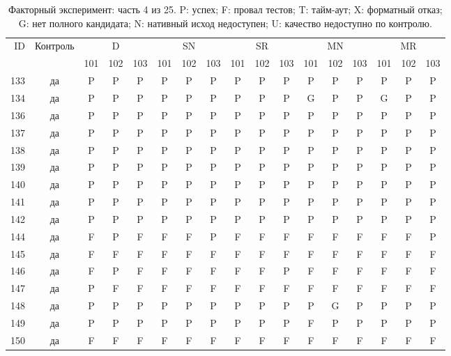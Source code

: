 \begin{table}[p]\centering\footnotesize
\setlength{\tabcolsep}{3pt}
\caption{Факторный эксперимент: часть 4 из 25. P: успех; F: провал тестов; T: тайм-аут; X: форматный отказ; G: нет полного кандидата; N: нативный исход недоступен; U: качество недоступно по контролю.}
\begin{tabular*}{\textwidth}{@{\extracolsep{\fill}}rcccccccccccccccc}\toprule
ID & Контроль & \multicolumn{3}{c}{D} & \multicolumn{3}{c}{SN} & \multicolumn{3}{c}{SR} & \multicolumn{3}{c}{MN} & \multicolumn{3}{c}{MR}\\
\cmidrule(lr){3-5}\cmidrule(lr){6-8}\cmidrule(lr){9-11}\cmidrule(lr){12-14}\cmidrule(lr){15-17}
 & & 101 & 102 & 103 & 101 & 102 & 103 & 101 & 102 & 103 & 101 & 102 & 103 & 101 & 102 & 103\\\midrule
133 & да & P & P & P & P & P & P & P & P & P & P & P & P & P & P & P\\
134 & да & P & P & P & P & P & P & P & P & P & G & P & P & G & P & P\\
136 & да & P & P & P & P & P & P & P & P & P & P & P & P & P & P & P\\
137 & да & P & P & P & P & P & P & P & P & P & P & P & P & P & P & P\\
138 & да & P & P & P & P & P & P & P & P & P & P & P & P & P & P & P\\
139 & да & P & P & P & P & P & P & P & P & P & P & P & P & P & P & P\\
140 & да & P & P & P & P & P & P & P & P & P & P & P & P & P & P & P\\
141 & да & P & P & P & P & P & P & P & P & P & P & P & P & P & P & P\\
142 & да & P & P & P & P & P & P & P & P & P & P & P & P & P & P & P\\
144 & да & F & P & F & F & F & P & F & F & F & F & F & F & F & F & P\\
145 & да & F & F & F & F & F & F & F & F & F & F & F & F & F & F & F\\
146 & да & F & P & F & F & F & F & F & F & P & F & F & F & F & F & F\\
147 & да & P & F & F & F & F & F & F & F & F & F & F & F & F & F & F\\
148 & да & P & P & P & P & P & P & P & P & P & P & G & P & P & P & P\\
149 & да & P & P & P & P & P & P & P & P & P & F & P & P & P & P & P\\
150 & да & F & F & F & F & F & F & F & F & F & F & F & F & F & F & F\\

\end{tabular*}
\end{table}

